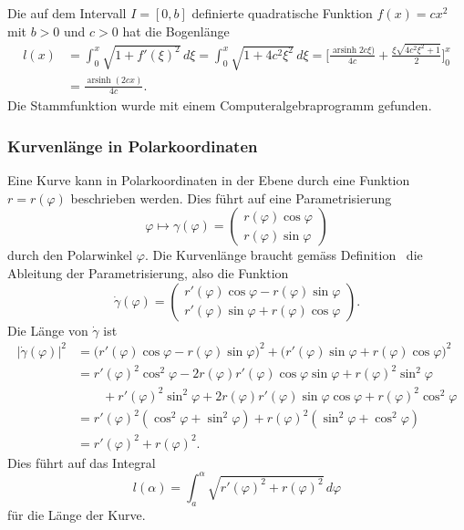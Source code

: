 \begin{beispiel}
Die auf dem Intervall $I=[0,b]$ definierte quadratische Funktion $f(x)=cx^2$
mit $b>0$ und $c>0$ hat die Bogenlänge
\begin{align*}
l(x)
&=
\int_0^x \sqrt{1+f'(\xi)^2}\,d\xi
=
\int_0^x \sqrt{1+4c^2\xi^2}\,d\xi
=
\biggl[
\frac{ \operatorname{arsinh}2c\xi)}{4c} + \frac{\xi\sqrt{4c^2\xi^2+1}}{2}
\biggr]_0^x
\\
&=
\frac{ \operatorname{arsinh}(2cx)}{4c}.
\end{align*}
Die Stammfunktion wurde mit einem Computeralgebraprogramm gefunden.
\end{beispiel}

%
%
\subsubsection{Kurvenlänge in Polarkoordinaten}
Eine Kurve kann in Polarkoordinaten in der Ebene durch eine Funktion
$r=r(\varphi)$ beschrieben werden.
Dies führt auf eine Parametrisierung
\[
\varphi \mapsto \gamma(\varphi)=\begin{pmatrix}
r(\varphi)\cos\varphi\\
r(\varphi)\sin\varphi
\end{pmatrix}
\]
durch den Polarwinkel $\varphi$.
Die Kurvenlänge braucht gemäss 
Definition~\label{buch:geometrie:def:kurvenlaenge}
die Ableitung der Parametrisierung, also die Funktion
\[
\dot{\gamma}(\varphi)
=
\begin{pmatrix}
r'(\varphi)\cos\varphi - r(\varphi)\sin\varphi\\
r'(\varphi)\sin\varphi + r(\varphi)\cos\varphi
\end{pmatrix}.
\]
Die Länge von $\dot{\gamma}$ ist
\begin{align*}
|\dot{\gamma}(\varphi)|^2
&=
\bigl(
r'(\varphi)\cos\varphi - r(\varphi)\sin\varphi
\bigr)^2
+
\bigl(
r'(\varphi)\sin\varphi + r(\varphi)\cos\varphi
\bigr)^2
\\
&=
r'(\varphi)^2\cos^2\varphi
-2r(\varphi)r'(\varphi)\cos\varphi\sin\varphi
+r(\varphi)^2\sin^2\varphi
\\
&\qquad
+r'(\varphi)^2\sin^2\varphi
+2r(\varphi)r'(\varphi)\sin\varphi\cos\varphi
+r(\varphi)^2\cos^2\varphi
\\
&=r'(\varphi)^2(\cos^2\varphi+\sin^2\varphi)
+ r(\varphi)^2(\sin^2\varphi+\cos^2\varphi)
\\
&=
r'(\varphi)^2 + r(\varphi)^2.
\end{align*}
Dies führt auf das
Integral
\begin{equation}
l(\alpha)
=
\int_a^\alpha \sqrt{r'(\varphi)^2 + r(\varphi)^2}\,d\varphi
\end{equation}
für die Länge der Kurve.

